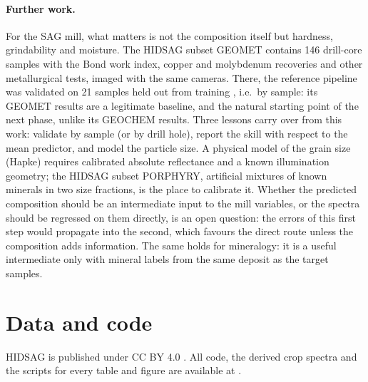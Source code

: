 \documentclass[11pt,a4paper]{article}
\begin{document}
\paragraph{Further work.} For the SAG mill, what matters is not the composition itself but hardness, grindability
and moisture. The HIDSAG subset GEOMET contains 146 drill-core samples with the Bond work index, copper and
molybdenum recoveries and other metallurgical tests, imaged with the same cameras. There, the reference pipeline was
validated on 21 samples held out from training \citep{Ehrenfeld2023}, i.e.\ by sample: its GEOMET results are a
legitimate baseline, and the natural starting point of the next phase, unlike its GEOCHEM results. Three lessons
carry over from this work: validate by sample (or by drill hole), report the skill with respect to the mean
predictor, and model the particle size. A physical model of the grain size (Hapke) requires calibrated absolute
reflectance and a known illumination geometry; the HIDSAG subset PORPHYRY, artificial mixtures of known minerals in
two size fractions, is the place to calibrate it. Whether the predicted composition should be an intermediate input to the
mill variables, or the spectra should be regressed on them directly, is an open question: the errors of this first
step would propagate into the second, which favours the direct route unless the composition adds information. The
same holds for mineralogy: it is a useful intermediate only with mineral labels from the same deposit as the
target samples.

\section*{Data and code}
HIDSAG is published under CC BY 4.0 \citep{HIDSAGdata}. All code, the derived crop spectra and the scripts for every
table and figure are available at \citet{Repo}.



\end{document}
